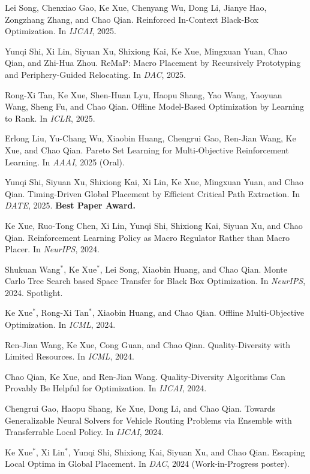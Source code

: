 \documentclass[11pt,a4paper]{article}
\begin{document}
\begin{cvbullet}
  \item Lei Song, Chenxiao Gao, Ke Xue, Chenyang Wu, Dong Li, Jianye Hao, Zongzhang Zhang, and Chao Qian. Reinforced In-Context Black-Box Optimization. In \textit{IJCAI}, 2025.
  \item Yunqi Shi, Xi Lin, Siyuan Xu, Shixiong Kai, Ke Xue, Mingxuan Yuan, Chao Qian, and Zhi-Hua Zhou. ReMaP: Macro Placement by Recursively Prototyping and Periphery-Guided Relocating. In \textit{DAC}, 2025.
  \item Rong-Xi Tan, Ke Xue, Shen-Huan Lyu, Haopu Shang, Yao Wang, Yaoyuan Wang, Sheng Fu, and Chao Qian. Offline Model-Based Optimization by Learning to Rank. In \textit{ICLR}, 2025.
  \item Erlong Liu, Yu-Chang Wu, Xiaobin Huang, Chengrui Gao, Ren-Jian Wang, Ke Xue, and Chao Qian. Pareto Set Learning for Multi-Objective Reinforcement Learning. In \textit{AAAI}, 2025 (Oral).
  \item Yunqi Shi, Siyuan Xu, Shixiong Kai, Xi Lin, Ke Xue, Mingxuan Yuan, and Chao Qian. Timing-Driven Global Placement by Efficient Critical Path Extraction. In \textit{DATE}, 2025. \textbf{Best Paper Award.}
  \item Ke Xue, Ruo-Tong Chen, Xi Lin, Yunqi Shi, Shixiong Kai, Siyuan Xu, and Chao Qian. Reinforcement Learning Policy as Macro Regulator Rather than Macro Placer. In \textit{NeurIPS}, 2024.
  \item Shukuan Wang$^*$, Ke Xue$^*$, Lei Song, Xiaobin Huang, and Chao Qian. Monte Carlo Tree Search based Space Transfer for Black Box Optimization. In \textit{NeurIPS}, 2024. Spotlight.
  \item Ke Xue$^*$, Rong-Xi Tan$^*$, Xiaobin Huang, and Chao Qian. Offline Multi-Objective Optimization. In \textit{ICML}, 2024.
  \item Ren-Jian Wang, Ke Xue, Cong Guan, and Chao Qian. Quality-Diversity with Limited Resources. In \textit{ICML}, 2024.
  \item Chao Qian, Ke Xue, and Ren-Jian Wang. Quality-Diversity Algorithms Can Provably Be Helpful for Optimization. In \textit{IJCAI}, 2024.
  \item Chengrui Gao, Haopu Shang, Ke Xue, Dong Li, and Chao Qian. Towards Generalizable Neural Solvers for Vehicle Routing Problems via Ensemble with Transferrable Local Policy. In \textit{IJCAI}, 2024.
  \item Ke Xue$^*$, Xi Lin$^*$, Yunqi Shi, Shixiong Kai, Siyuan Xu, and Chao Qian. Escaping Local Optima in Global Placement. In \textit{DAC}, 2024 (Work-in-Progress poster).

\end{cvbullet}
\end{document}
